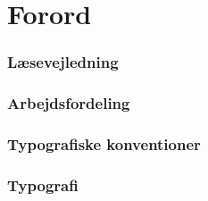 \chapter*{Forord}\label{chap:forord}


\subsection{Læsevejledning}

\subsection{Arbejdsfordeling}

\subsection{Typografiske konventioner}

\subsection{Typografi}
